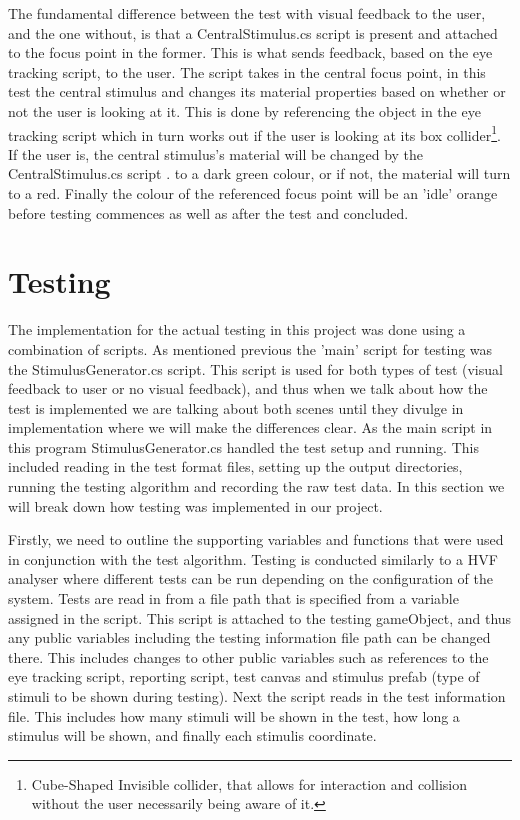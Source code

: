 \documentclass{l4proj}
\begin{document}
The fundamental difference between the test with visual feedback to the user, and the one without, is that a CentralStimulus.cs script is present and attached to the focus point in the former. This is what sends feedback, based on the eye tracking script, to the user. The script takes in the central focus point, in this test the central stimulus and changes its material properties based on whether or not the user is looking at it. This is done by referencing the object in the eye tracking script which in turn works out if the user is looking at its box collider\footnote{Cube-Shaped Invisible collider, that allows for interaction and collision without the user necessarily being aware of it.}. If the user is, the central stimulus's material will be changed by the CentralStimulus.cs script . to a dark green colour, or if not, the material will turn to a red. Finally the colour of the referenced focus point will be an 'idle' orange before testing commences as well as after the test and concluded.
\section{Testing}
The implementation for the actual testing in this project was done using a combination of scripts. As mentioned previous the 'main' script for testing was the StimulusGenerator.cs script. This script is used for both types of test (visual feedback to user or no visual feedback), and thus when we talk about how the test is implemented we are talking about both scenes until they divulge in implementation where we will make the differences clear. As the main script in this program StimulusGenerator.cs handled the test setup and running. This included reading in the test format files, setting up the output directories, running the testing algorithm and recording the raw test data. In this section we will break down how testing was implemented in our project.

Firstly, we need to outline the supporting variables and functions that were used in conjunction with the test algorithm. Testing is conducted similarly to a HVF analyser where different tests can be run depending on the configuration of the system. Tests are read in from a file path that is specified from a variable assigned in the script. This script is attached to the testing gameObject, and thus any public variables including the testing information file path can be changed there. This includes changes to other public variables such as references to the eye tracking script, reporting script, test canvas and stimulus prefab (type of stimuli to be shown during testing). Next the script reads in the test information file. This includes how many stimuli will be shown in the test, how long a stimulus will be shown, and finally each stimulis coordinate.
\end{document}
